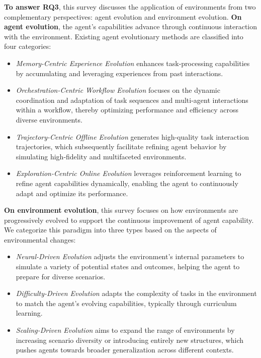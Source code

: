 \textbf{To answer RQ3}, this survey discusses the application of environments from two complementary perspectives: agent evolution and environment evolution. 
\textbf{On agent evolution}, the agent’s capabilities advance through continuous interaction with the environment. Existing agent evolutionary methods are classified into four categories:



\begin{itemize}

\item \textit{Memory-Centric Experience Evolution} enhances task-processing capabilities by accumulating and leveraging experiences from past interactions. 

\item \textit{Orchestration-Centric Workflow Evolution} focuses on the dynamic coordination and adaptation of task sequences and multi-agent interactions within a workflow, thereby optimizing performance and efficiency across diverse environments. 

\item \textit{Trajectory-Centric Offline Evolution} generates high-quality task interaction trajectories, which subsequently facilitate refining agent behavior by simulating high-fidelity and multifaceted environments. 

\item \textit{Exploration-Centric Online Evolution} leverages reinforcement learning  to refine agent capabilities dynamically, enabling the agent to continuously adapt and optimize its performance.

\end{itemize}


\textbf{On environment evolution}, this survey focuses on how environments are progressively evolved to support the continuous improvement of agent capability. We categorize this paradigm into three types based on the aspects of environmental changes:

\begin{itemize}

\item \textit{Neural-Driven Evolution} adjusts the environment’s internal parameters to simulate a variety of potential states and outcomes, helping the agent to prepare for diverse scenarios. 

\item \textit{Difficulty-Driven Evolution} adapts the complexity of tasks in the environment to match the agent's evolving capabilities, typically through curriculum learning. 

\item \textit{Scaling-Driven Evolution} aims to expand the range of environments by increasing scenario diversity or introducing entirely new structures, which pushes agents towards broader generalization across different contexts.

\end{itemize}


